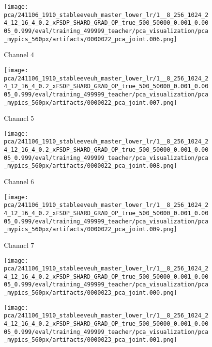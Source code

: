 \begin{figure*}[p]
\begin{subfigure}[t]{0.097\textwidth}
    \end{subfigure}\hfill
    \begin{subfigure}[t]{0.097\textwidth}
        \centering
        \caption*{Channel 4}
        \texttt{[image: pca/241106\_1910\_stableeveuh\_master\_lower\_lr/1\_\_8\_256\_1024\_24\_12\_16\_4\_0.2\_xFSDP\_SHARD\_GRAD\_OP\_true\_500\_50000\_0.001\_0.0005\_0.999/eval/training\_499999\_teacher/pca\_visualization/pca\_mypics\_560px/artifacts/0000022\_pca\_joint.006.png]}
    \end{subfigure}\hfill
    \begin{subfigure}[t]{0.097\textwidth}
        \centering
        \caption*{Channel 5}
        \texttt{[image: pca/241106\_1910\_stableeveuh\_master\_lower\_lr/1\_\_8\_256\_1024\_24\_12\_16\_4\_0.2\_xFSDP\_SHARD\_GRAD\_OP\_true\_500\_50000\_0.001\_0.0005\_0.999/eval/training\_499999\_teacher/pca\_visualization/pca\_mypics\_560px/artifacts/0000022\_pca\_joint.007.png]}
    \end{subfigure}\hfill
    \begin{subfigure}[t]{0.097\textwidth}
        \centering
        \caption*{Channel 6}
        \texttt{[image: pca/241106\_1910\_stableeveuh\_master\_lower\_lr/1\_\_8\_256\_1024\_24\_12\_16\_4\_0.2\_xFSDP\_SHARD\_GRAD\_OP\_true\_500\_50000\_0.001\_0.0005\_0.999/eval/training\_499999\_teacher/pca\_visualization/pca\_mypics\_560px/artifacts/0000022\_pca\_joint.008.png]}
    \end{subfigure}\hfill
    \begin{subfigure}[t]{0.097\textwidth}
        \centering
        \caption*{Channel 7}
        \texttt{[image: pca/241106\_1910\_stableeveuh\_master\_lower\_lr/1\_\_8\_256\_1024\_24\_12\_16\_4\_0.2\_xFSDP\_SHARD\_GRAD\_OP\_true\_500\_50000\_0.001\_0.0005\_0.999/eval/training\_499999\_teacher/pca\_visualization/pca\_mypics\_560px/artifacts/0000022\_pca\_joint.009.png]}
    \end{subfigure}
    \begin{subfigure}[t]{0.097\textwidth}
        \centering
        \texttt{[image: pca/241106\_1910\_stableeveuh\_master\_lower\_lr/1\_\_8\_256\_1024\_24\_12\_16\_4\_0.2\_xFSDP\_SHARD\_GRAD\_OP\_true\_500\_50000\_0.001\_0.0005\_0.999/eval/training\_499999\_teacher/pca\_visualization/pca\_mypics\_560px/artifacts/0000023\_pca\_joint.000.png]}
    \end{subfigure}\hfill
    \begin{subfigure}[t]{0.097\textwidth}
        \centering
        \texttt{[image: pca/241106\_1910\_stableeveuh\_master\_lower\_lr/1\_\_8\_256\_1024\_24\_12\_16\_4\_0.2\_xFSDP\_SHARD\_GRAD\_OP\_true\_500\_50000\_0.001\_0.0005\_0.999/eval/training\_499999\_teacher/pca\_visualization/pca\_mypics\_560px/artifacts/0000023\_pca\_joint.001.png]}

\end{subfigure}
\end{figure*}
